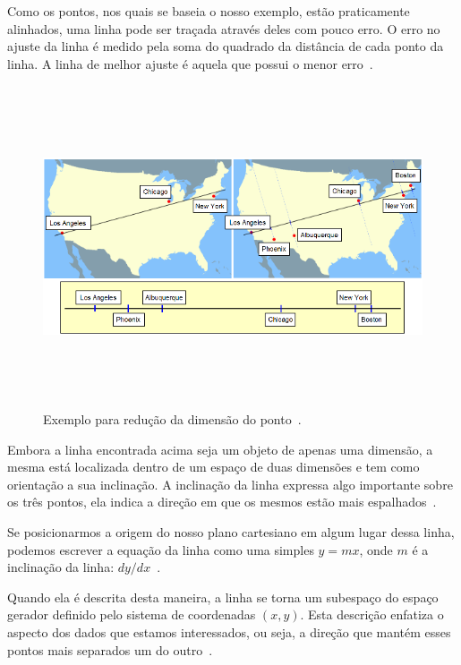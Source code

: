 Como os pontos, nos quais se baseia o nosso exemplo, estão praticamente alinhados, uma linha pode ser traçada através deles com pouco erro. O erro no ajuste da linha é medido pela soma do quadrado da distância de cada ponto da linha. A linha de melhor ajuste é aquela que possui o menor erro~\cite{hewitt}.

	\begin{figure}[hbt]
		\begin{center}
			\includegraphics[height=9.5cm,width=12.5cm]{figuras/2.FundamentacaoTeorica/PCAexemploMapa.png}
		\end{center}
		\caption{Exemplo para redução da dimensão do ponto~\cite{hewitt}.}
		\label{exemploPCA}
	\end{figure}

Embora a linha encontrada acima seja um objeto de apenas uma dimensão, a mesma está localizada dentro de um espaço de duas dimensões e tem como orientação a sua inclinação. A inclinação da linha expressa algo importante sobre os três pontos, ela indica a direção em que os mesmos estão mais espalhados~\cite{hewitt}.

Se posicionarmos a origem do nosso plano cartesiano em algum lugar dessa linha, podemos escrever a equação da linha como uma simples $y = mx$, onde $\displaystyle m$ é a inclinação da linha: $dy / dx$~\cite{hewitt}.

Quando ela é descrita desta maneira, a linha se torna um subespaço do espaço gerador definido pelo sistema de coordenadas $\displaystyle (x,y)$. Esta descrição enfatiza o aspecto dos dados que estamos interessados, ou seja, a direção que mantém esses pontos mais separados um do outro~\cite{hewitt}.

